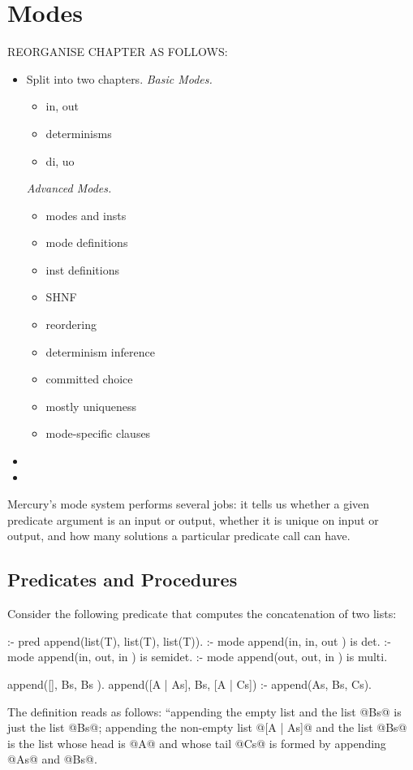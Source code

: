 
\chapter{Modes}

REORGANISE CHAPTER AS FOLLOWS:
\begin{itemize}
\item Split into two chapters.
\emph{Basic Modes.}
\begin{itemize}
\item in, out
\item determinisms
\item di, uo
\end{itemize}
\emph{Advanced Modes.}
\begin{itemize}
\item modes and insts
\item mode definitions
\item inst definitions
\item SHNF
\item reordering
\item determinism inference
\item committed choice
\item mostly uniqueness
\item mode-specific clauses
\end{itemize}
\item {}
\item {}
\end{itemize}


Mercury's mode system performs several jobs: it tells us whether a given
predicate argument is an input or output, whether it is unique on input
or output, and how many solutions a particular predicate call can have.

\section{Predicates and Procedures}

Consider the following predicate that computes the concatenation of two
lists:
\begin{myverbatim}
:- pred append(list(T), list(T), list(T)).
:- mode append(in,      in,      out    ) is det.
:- mode append(in,      out,     in     ) is semidet.
:- mode append(out,     out,     in     ) is multi.

append([],       Bs, Bs      ).
append([A | As], Bs, [A | Cs]) :- append(As, Bs, Cs).
\end{myverbatim}
The definition reads as follows: ``appending the empty list and the list
@Bs@ is just the list @Bs@; appending the non-empty list @[A | As]@ and
the list @Bs@ is the list whose head is @A@ and whose tail @Cs@ is
formed by appending @As@ and @Bs@.

